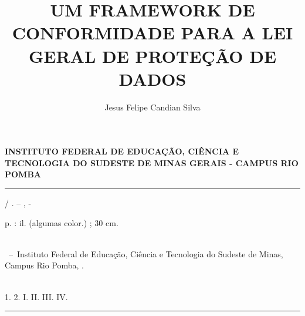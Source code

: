 \documentclass[
	12pt,				%
	openright,			%
	oneside,			%
	a4paper,			%
	english,			%
	french,				%
	spanish,			%
	brazil,				%
	]{abntex2}
\author{Jesus Felipe Candian Silva}
\title{UM FRAMEWORK DE CONFORMIDADE PARA A LEI GERAL DE PROTEÇÃO DE DADOS}
\begin{document}
\frenchspacing 


\begin{center}
\textbf{ 
INSTITUTO FEDERAL DE EDUCAÇÃO, CIÊNCIA E TECNOLOGIA DO SUDESTE DE MINAS GERAIS - CAMPUS RIO POMBA}
\end{center}

\imprimircapa

\imprimirfolhaderosto*


%
%     
\begin{fichacatalografica}
	\vspace*{\fill}					%
	\hrule							%
	\begin{center}					%
	\begin{minipage}[c]{12.5cm}		%
	
	\imprimirautor
	
	\hspace{0.5cm} \imprimirtitulo  / \imprimirautor. --
	\imprimirlocal, \imprimirdata-
	
	\hspace{0.5cm} \pageref{LastPage} p. : il. (algumas color.) ; 30 cm.\\
	
	\hspace{0.5cm} \imprimirorientadorRotulo~\imprimirorientador\\
	
	\hspace{0.5cm}
	\parbox[t]{\textwidth}{\imprimirtipotrabalho~--~Instituto Federal de Educação, Ciência e Tecnologia do Sudeste de Minas, Campus Rio Pomba,
	\imprimirdata.}\\
	
	\hspace{0.5cm}
		1. 
		2. 
		I. 
		II.
		III.
		IV. \\ 			
	
	\hspace{8.75cm} %
	
	\end{minipage}
	\end{center}
	\hrule
\end{fichacatalografica}
\end{document}
